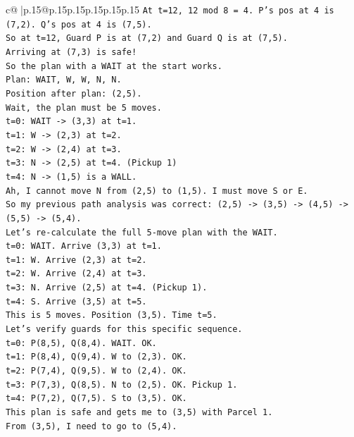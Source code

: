 \documentclass{article}
\begin{document}
{\begin{supertabular}{c@{$\;$}|p{.15\linewidth}@{}p{.15\linewidth}p{.15\linewidth}p{.15\linewidth}p{.15\linewidth}p{.15\linewidth}}
{{{\texttt{At t=12, 12 mod 8 = 4. P's pos at 4 is (7,2). Q's pos at 4 is (7,5).} \\
\texttt{So at t=12, Guard P is at (7,2) and Guard Q is at (7,5).} \\
\texttt{Arriving at (7,3) is safe!} \\
\texttt{So the plan with a WAIT at the start works.} \\
\texttt{Plan: WAIT, W, W, N, N.} \\
\texttt{Position after plan: (2,5).} \\
\texttt{Wait, the plan must be 5 moves.} \\
\texttt{t=0: WAIT {-}> (3,3) at t=1.} \\
\texttt{t=1: W {-}> (2,3) at t=2.} \\
\texttt{t=2: W {-}> (2,4) at t=3.} \\
\texttt{t=3: N {-}> (2,5) at t=4. (Pickup 1)} \\
\texttt{t=4: N {-}> (1,5) is a WALL.} \\
\texttt{Ah, I cannot move N from (2,5) to (1,5). I must move S or E.} \\
\texttt{So my previous path analysis was correct: (2,5) {-}> (3,5) {-}> (4,5) {-}> (5,5) {-}> (5,4).} \\
\texttt{Let's re{-}calculate the full 5{-}move plan with the WAIT.} \\
\texttt{t=0: WAIT. Arrive (3,3) at t=1.} \\
\texttt{t=1: W. Arrive (2,3) at t=2.} \\
\texttt{t=2: W. Arrive (2,4) at t=3.} \\
\texttt{t=3: N. Arrive (2,5) at t=4. (Pickup 1).} \\
\texttt{t=4: S. Arrive (3,5) at t=5.} \\
\texttt{This is 5 moves. Position (3,5). Time t=5.} \\
\texttt{Let's verify guards for this specific sequence.} \\
\texttt{t=0: P(8,5), Q(8,4). WAIT. OK.} \\
\texttt{t=1: P(8,4), Q(9,4). W to (2,3). OK.} \\
\texttt{t=2: P(7,4), Q(9,5). W to (2,4). OK.} \\
\texttt{t=3: P(7,3), Q(8,5). N to (2,5). OK. Pickup 1.} \\
\texttt{t=4: P(7,2), Q(7,5). S to (3,5). OK.} \\
\texttt{This plan is safe and gets me to (3,5) with Parcel 1.} \\
\texttt{From (3,5), I need to go to (5,4).} \\
}}}
\end{supertabular}}
\end{document}
